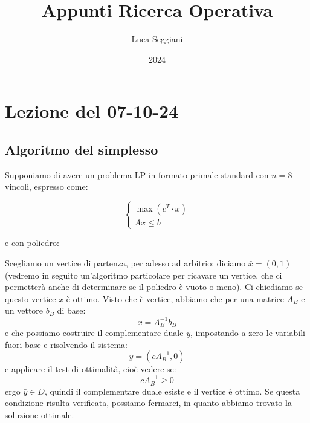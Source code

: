 \documentclass[a4paper,11pt]{article}
\title{Appunti Ricerca Operativa}
\author{Luca Seggiani}
\date{2024}
\begin{document}
\section{Lezione del 07-10-24}

\thispagestyle{empty}
\pagestyle{fancy}

\subsection{Algoritmo del simplesso}
Supponiamo di avere un problema LP in formato primale standard con $n = 8$ vincoli, espresso come:

\[
	\begin{cases}
		\max(c^T \cdot x) \\
		Ax \leq b
	\end{cases}
\]

e con poliedro:

\begin{center}
\end{center}

Scegliamo un vertice di partenza, per adesso ad arbitrio: diciamo $\bar{x} = (0, 1)$ (vedremo in seguito un'algoritmo particolare per ricavare un vertice, che ci permetterà anche di determinare se il poliedro è vuoto o meno).
Ci chiediamo se questo vertice $\bar{x}$ è ottimo.
Visto che è vertice, abbiamo che per una matrice $A_B$ e un vettore $b_B$ di base:
$$
\bar{x} = A_B^{-1} b_B
$$
e che possiamo costruire il complementare duale $\bar{y}$, impostando a zero le variabili fuori base e risolvendo il sistema:
$$
\bar{y} = (cA_B^{-1}, 0)
$$
e applicare il test di ottimalità, cioè vedere se:
$$
cA_B^{-1} \geq 0
$$
ergo $\bar{y} \in D$, quindi il complementare duale esiste e il vertice è ottimo.
Se questa condizione risulta verificata, possiamo fermarci, in quanto abbiamo trovato la soluzione ottimale.
\end{document}
